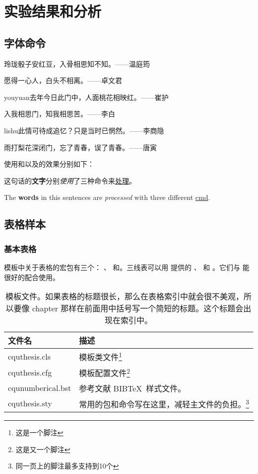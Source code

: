 \chapter{实验结果和分析}

\section{字体命令}\label{txt:FreqCmd}
{\kaishu 玲珑骰子安红豆，入骨相思知不知。\hfill ——温庭筠}
	
{\fangsong 愿得一心人，白头不相离。\hfill ——卓文君}
		
{\ifcsname youyuan\endcsname\youyuan\else[无 \cs{youyuan} 字体。]\fi 去年今日此门中，人面桃花相映红。\hfill ——崔护}
			
{\heiti 入我相思门，知我相思苦。\hfill ——李白}
				
{\ifcsname lishu\endcsname\lishu\else[无 \cs{lishu} 字体。]\fi 此情可待成追忆？只是当时已惘然。\hfill ——李商隐}
					
{\songti 雨打梨花深闭门，忘了青春，误了青春。\hfill ——唐寅}

使用和以及的效果分别如下：

这句话的\textbf{文字}分别\textit{使用}了三种命令来\underline{处理}。

The \textbf{words} in this sentences are \textit{processed} with three different \underline{cmd}.

\section{表格样本}

\subsection{基本表格}
\label{sec:basictable}

模板中关于表格的宏包有三个： 、 和。三线表可以用 提供的 、 和 。它们与 能很好的配合使用。
\begin{table}[htb]
	\centering
	\begin{minipage}[t]{0.9\linewidth} %
	\caption[模板文件]{模板文件。如果表格的标题很长，那么在表格索引中就会很不美观，所以要像 chapter 那样在前面用中括号写一个简短的标题。这个标题会出现在索引中。}
	\label{tab:template-files}
	\begin{tabularx}{\linewidth}{lX}
		\toprule
		{\heiti 文件名} & {\heiti 描述} \\
		\midrule
		cquthesis.cls & 模板类文件\footnote{这是一个脚注}\\
		cquthesis.cfg & 模板配置文件\footnote{这是又一个脚注}\\
		cqunumberical.bst & 参考文献 BIB\TeX\ 样式文件。\\
		cquthesis.sty & 常用的包和命令写在这里，减轻主文件的负担。\footnote{同一页上的脚注最多支持到10个}\\
		\bottomrule
		\end{tabularx}
	\end{minipage}
\end{table}

